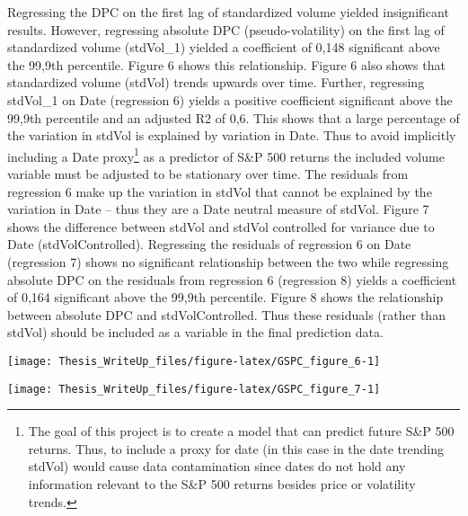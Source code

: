 \documentclass[11pt,preprint, authoryear]{elsarticle}
\let\origfigure\figure
\let\endorigfigure\endfigure
\renewenvironment{figure}[1][2] {
    \expandafter\origfigure\expandafter[H]
} {
    \endorigfigure
}
\numberwithin{equation}{section}
\numberwithin{figure}{section}
\numberwithin{table}{section}
\let\rmarkdownfootnote\footnote%
\def\footnote{\protect\rmarkdownfootnote}
\begin{document}
Regressing the DPC on the first lag of standardized volume yielded
insignificant results. However, regressing absolute DPC
(pseudo-volatility) on the first lag of standardized volume (stdVol\_1)
yielded a coefficient of 0,148 significant above the 99,9th percentile.
Figure 6 shows this relationship. Figure 6 also shows that standardized
volume (stdVol) trends upwards over time. Further, regressing stdVol\_1
on Date (regression 6) yields a positive coefficient significant above
the 99,9th percentile and an adjusted R2 of 0,6. This shows that a large
percentage of the variation in stdVol is explained by variation in Date.
Thus to avoid implicitly including a Date proxy\footnote{The goal of
  this project is to create a model that can predict future S\&P 500
  returns. Thus, to include a proxy for date (in this case in the date
  trending stdVol) would cause data contamination since dates do not
  hold any information relevant to the S\&P 500 returns besides price or
  volatility trends.} as a predictor of S\&P 500 returns the included
volume variable must be adjusted to be stationary over time. The
residuals from regression 6 make up the variation in stdVol that cannot
be explained by the variation in Date -- thus they are a Date neutral
measure of stdVol. Figure 7 shows the difference between stdVol and
stdVol controlled for variance due to Date (stdVolControlled).
Regressing the residuals of regression 6 on Date (regression 7) shows no
significant relationship between the two while regressing absolute DPC
on the residuals from regression 6 (regression 8) yields a coefficient
of 0,164 significant above the 99,9th percentile. Figure 8 shows the
relationship between absolute DPC and stdVolControlled. Thus these
residuals (rather than stdVol) should be included as a variable in the
final prediction data.

\begin{figure}[H]

{\centering \texttt{[image: Thesis\_WriteUp\_files/figure-latex/GSPC\_figure\_6-1]} 

}

\caption{Absolute logDiff and stdVol \label{Figure6}}\label{fig:GSPC_figure_6}
\end{figure}

\begin{figure}[H]

{\centering \texttt{[image: Thesis\_WriteUp\_files/figure-latex/GSPC\_figure\_7-1]} 

}

\caption{DateResid of StdVol (Red) and stdVol (Green) \label{Figure7}}\label{fig:GSPC_figure_7}
\end{figure}
\end{document}
